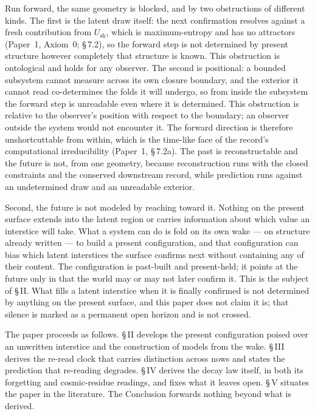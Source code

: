 \documentclass[11pt,oneside]{report}
\theoremstyle{definition}
\theoremstyle{remark}
\begin{document}
Run forward, the same geometry is blocked, and by two obstructions of
different kinds. The first is the latent draw itself: the next
confirmation resolves against a fresh contribution from
\ensuremath{U_{\mathrm{sh}}}, which is maximum-entropy and has no
attractors (Paper~1, Axiom~0; \S\,7.2), so the forward step is not
determined by present structure however completely that structure is
known. This obstruction is ontological and holds for any observer. The
second is positional: a bounded subsystem cannot measure across its own
closure boundary, and the exterior it cannot read co-determines the folds
it will undergo, so from inside the subsystem the forward step is
unreadable even where it is determined. This obstruction is relative to
the observer's position with respect to the boundary; an observer outside
the system would not encounter it. The forward direction is therefore
unshortcuttable from within, which is the time-like face of the
record's computational irreducibility (Paper~1, \S\,7.2a). The past is
reconstructable and the future is not, from one geometry, because
reconstruction runs with the closed constraints and the conserved
downstream record, while prediction runs against an undetermined draw and
an unreadable exterior.

Second, the future is not modeled by reaching toward it. Nothing on the
present surface extends into the latent region or carries information
about which value an interstice will take. What a system can do is fold
on its own wake --- on structure already written --- to build a present
configuration, and that configuration can bias which latent interstices
the surface confirms next without containing any of their content. The
configuration is past-built and present-held; it points at the future
only in that the world may or may not later confirm it. This is the
subject of \S\,II. What fills a latent interstice when it is finally
confirmed is not determined by anything on the present surface, and this
paper does not claim it is; that silence is marked as a permanent open
horizon and is not crossed.

The paper proceeds as follows. \S\,II develops the present configuration
poised over an unwritten interstice and the construction of models from
the wake. \S\,III derives the re-read clock that carries distinction
across nows and states the prediction that re-reading degrades. \S\,IV
derives the decay law itself, in both its forgetting and cosmic-residue
readings, and fixes what it leaves open. \S\,V situates the paper in the
literature. The Conclusion forwards nothing beyond what is derived.
\end{document}
